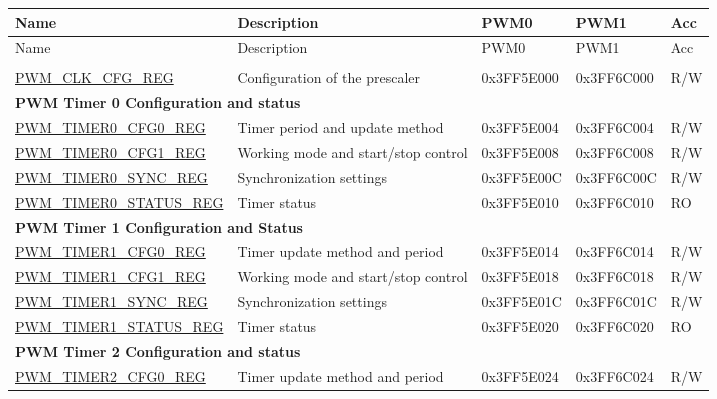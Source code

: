 
\begin{longtable}{ | p{5.5cm} | p{5.7cm} | p{2cm} | p{2cm} | p{0.8cm} | }
\hline\rowcolor{lightgray}
Name & Description & PWM0 & PWM1 & Acc \\ \hline

\endfirsthead
        \hline
        \rowcolor{lightgray}
   Name & Description & PWM0 & PWM1 & Acc \\
        \hline
        \endhead
        \endfoot

\multicolumn{5}{|l|}{\textbf{Prescaler configuration}} \\ \hline
\hyperref[regdesc:PWMCLKCFGREG]{PWM\_CLK\_CFG\_REG} &  Configuration of the prescaler & 0x3FF5E000 & 0x3FF6C000 & R/W \\ \hline
\multicolumn{5}{|l|}{\textbf{PWM Timer 0 Configuration and status}} \\ \hline
\hyperref[regdesc:PWMTIMER0CFG0REG]{PWM\_TIMER0\_CFG0\_REG} & Timer period and update method & 0x3FF5E004 & 0x3FF6C004 & R/W \\ \hline
\hyperref[regdesc:PWMTIMER0CFG1REG]{PWM\_TIMER0\_CFG1\_REG} & Working mode and start/stop control & 0x3FF5E008 & 0x3FF6C008 & R/W \\ \hline
\hyperref[regdesc:PWMTIMER0SYNCREG]{PWM\_TIMER0\_SYNC\_REG} & Synchronization settings & 0x3FF5E00C & 0x3FF6C00C & R/W \\ \hline
\hyperref[regdesc:PWMTIMER0STATUSREG]{PWM\_TIMER0\_STATUS\_REG} & Timer status & 0x3FF5E010 & 0x3FF6C010 & RO \\ \hline
\multicolumn{5}{|l|}{\textbf{PWM Timer 1 Configuration and Status}} \\ \hline
\hyperref[regdesc:PWMTIMER1CFG0REG]{PWM\_TIMER1\_CFG0\_REG} & Timer update method and period & 0x3FF5E014 & 0x3FF6C014 & R/W \\ \hline
\hyperref[regdesc:PWMTIMER1CFG1REG]{PWM\_TIMER1\_CFG1\_REG} & Working mode and start/stop control & 0x3FF5E018 & 0x3FF6C018 & R/W \\ \hline
\hyperref[regdesc:PWMTIMER1SYNCREG]{PWM\_TIMER1\_SYNC\_REG} & Synchronization settings & 0x3FF5E01C & 0x3FF6C01C & R/W \\ \hline
\hyperref[regdesc:PWMTIMER1STATUSREG]{PWM\_TIMER1\_STATUS\_REG} & Timer status & 0x3FF5E020 & 0x3FF6C020 & RO \\ \hline
\multicolumn{5}{|l|}{\textbf{PWM Timer 2 Configuration and status}} \\ \hline
\hyperref[regdesc:PWMTIMER2CFG0REG]{PWM\_TIMER2\_CFG0\_REG} & Timer update method and period & 0x3FF5E024 & 0x3FF6C024 & R/W \\ \hline

\end{longtable}
